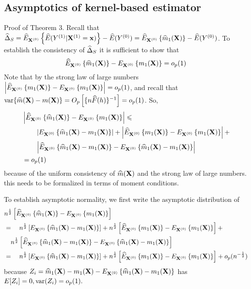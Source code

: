 \documentclass[useAMS,usenatbib,referee]{biom}
\begin{document}
\subsection{Asymptotics of kernel-based estimator}
Proof of Theorem 3. Recall that ${\widehat\Delta}_S = {\widehat E}_{{\bf X}^{(0)}}\left \{ {\widehat E}(Y^{(1)}| {\bf X}^{(1)} ={\bf x})\right \} - {\widehat E}(Y^{(0)}) = {\widehat E}_{{\bf X}^{(0)}}\left \{ {\widehat m}_1({\bf X})\right \} - {\widehat E}(Y^{(0)})$. To establish the consistency of ${\widehat\Delta}_S$ it is sufficient to show that 
\begin{align*}
    {\widehat E}_{{\bf X}^{(0)}}\left \{ {\widehat m}_1({\bf X})\right \} - E_{{\bf X}^{(0)}}\left \{ m_1({\bf X})\right \} = o_p(1)
\end{align*}
Note that by the strong law of large numbers $\left|{\widehat E}_{{\bf X}^{(0)}}\left \{ m_1({\bf X})\right \} - E_{{\bf X}^{(0)}}\left \{ m_1({\bf X})\right \}\right| = o_p(1)$, and recall that $\mbox{var}\{{\widehat m}({\bf X}) - m({\bf X})\} = O_p\left[\{n{\widehat F}(h)\}^{-1}\right] = o_p(1)$. So,
\begin{align*}
    &\left|{\widehat E}_{{\bf X}^{(0)}}\left \{ {\widehat m}_1({\bf X})\right \} - E_{{\bf X}^{(0)}}\left \{ m_1({\bf X})\right \}\right| \leqslant\\ &\qquad\left|E_{{\bf X}^{(0)}}\left \{ {\widehat m}_1({\bf X}) - m_1({\bf X})\right\}\right| + \left|{\widehat E}_{{\bf X}^{(0)}}\left \{ m_1({\bf X})\right \} - E_{{\bf X}^{(0)}}\left \{ m_1({\bf X})\right \}\right| +\\ &\qquad\left|{\widehat E}_{{\bf X}^{(0)}}\left \{ {\widehat m}_1({\bf X}) - m_1({\bf X})\right\} - E_{{\bf X}^{(0)}}\left \{ {\widehat m}_1({\bf X}) - m_1({\bf X})\right\}\right|\\
    &= o_p(1)
\end{align*}
because of the uniform consistency of ${\widehat m}({\bf X})$ and the strong law of large numbers. {\color{red} this needs to be formalized in terms of moment conditions.}

To establish asymptotic normality, we first write the asymptotic distribution of \begin{align*}
    &n^{\frac{1}{2}}\left[{\widehat E}_{{\bf X}^{(0)}}\left \{ {\widehat m}_1({\bf X})\right \} - E_{{\bf X}^{(0)}}\left \{ m_1({\bf X})\right \}\right]\\
     &=\quad n^{\frac{1}{2}}\left[E_{{\bf X}^{(0)}}\left \{ {\widehat m}_1({\bf X}) - m_1({\bf X})\right\}\right] + n^{\frac{1}{2}}\left[{\widehat E}_{{\bf X}^{(0)}}\left \{ m_1({\bf X})\right \} - E_{{\bf X}^{(0)}}\left \{ m_1({\bf X})\right \}\right] +\\ &\quad n^{\frac{1}{2}}\left[{\widehat E}_{{\bf X}^{(0)}}\left \{ {\widehat m}_1({\bf X}) - m_1({\bf X})\right\} - E_{{\bf X}^{(0)}}\left \{ {\widehat m}_1({\bf X}) - m_1({\bf X})\right\}\right]\\
     &= \quad n^{\frac{1}{2}}\left[E_{{\bf X}^{(0)}}\left \{ {\widehat m}_1({\bf X}) - m_1({\bf X})\right\}\right] + n^{\frac{1}{2}}\left[{\widehat E}_{{\bf X}^{(0)}}\left \{ m_1({\bf X})\right \} - E_{{\bf X}^{(0)}}\left \{ m_1({\bf X})\right \}\right] + o_p(n^{-\frac{1}{2}})
\end{align*}
because $Z_i = {\widehat m}_1({\bf X}) - m_1({\bf X}) - E_{{\bf X}^{(0)}}\left \{ {\widehat m}_1({\bf X}) - m_1({\bf X})\right\}$ has $E[Z_i] = 0, \mbox{var}(Z_i) = o_p(1).$
\end{document}
